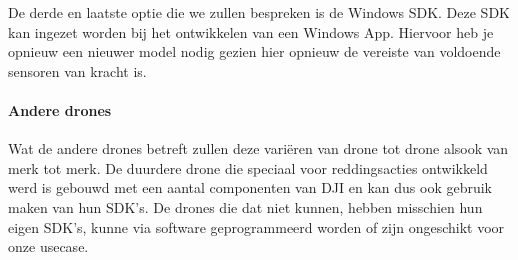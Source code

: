 De derde en laatste optie die we zullen bespreken is de Windows SDK. Deze SDK kan ingezet worden bij het ontwikkelen van een Windows App. Hiervoor heb je opnieuw een nieuwer model nodig gezien hier opnieuw de vereiste van voldoende sensoren van kracht is. 

\paragraph{Andere drones}

Wat de andere drones betreft zullen deze variëren van drone tot drone alsook van merk tot merk. De duurdere drone die speciaal voor reddingsacties ontwikkeld werd is gebouwd met een aantal componenten van DJI en kan dus ook gebruik maken van hun SDK's. De drones die dat niet kunnen, hebben misschien hun eigen SDK's, kunne via software geprogrammeerd worden of zijn ongeschikt voor onze usecase.
